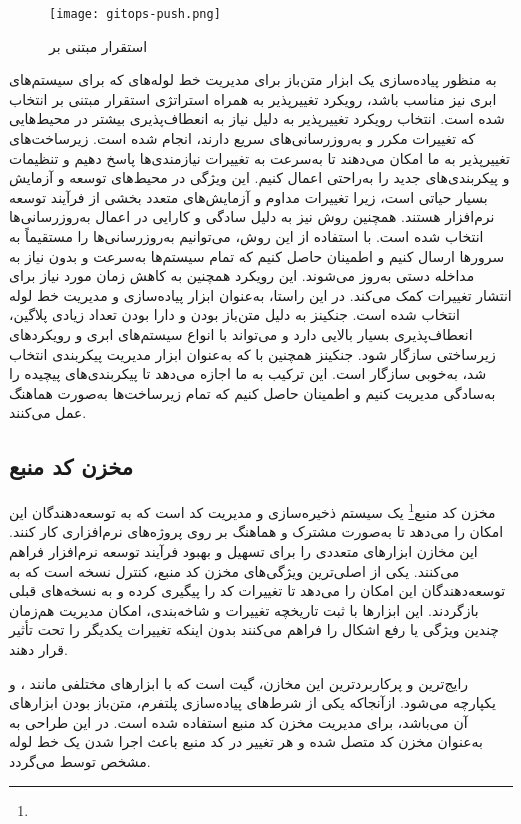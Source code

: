\begin{figure}[t]
	\centering
	\texttt{[image: gitops-push.png]}
	\caption{استقرار مبتنی بر }
	\label{fig: gitops push}
\end{figure}

به منظور پیاده‌سازی یک ابزار متن‌باز برای مدیریت خط لوله‌های  که برای سیستم‌های ابری نیز مناسب باشد، رویکرد تغییرپذیر به همراه استراتژی استقرار مبتنی بر  انتخاب شده است. انتخاب رویکرد تغییرپذیر به دلیل نیاز به انعطاف‌پذیری بیشتر در محیط‌هایی که تغییرات مکرر و به‌روزرسانی‌های سریع دارند، انجام شده است. زیرساخت‌های تغییرپذیر به ما امکان می‌دهند تا به‌سرعت به تغییرات نیازمندی‌ها پاسخ دهیم و تنظیمات و پیکربندی‌های جدید را به‌راحتی اعمال کنیم. این ویژگی در محیط‌های توسعه و آزمایش بسیار حیاتی است، زیرا تغییرات مداوم و آزمایش‌های متعدد بخشی از فرآیند توسعه نرم‌افزار هستند. همچنین روش  نیز به دلیل سادگی و کارایی در اعمال به‌روزرسانی‌ها انتخاب شده است. با استفاده از این روش، می‌توانیم به‌روزرسانی‌ها را مستقیماً به سرورها ارسال کنیم و اطمینان حاصل کنیم که تمام سیستم‌ها به‌سرعت و بدون نیاز به مداخله دستی به‌روز می‌شوند. این رویکرد همچنین به کاهش زمان مورد نیاز برای انتشار تغییرات کمک می‌کند. در این راستا،  به‌عنوان ابزار پیاده‌سازی و مدیریت خط لوله  انتخاب شده است. جنکینز به دلیل متن‌باز بودن و دارا بودن تعداد زیادی پلاگین، انعطاف‌پذیری بسیار بالایی دارد و می‌تواند با انواع سیستم‌های ابری و رویکردهای زیرساختی سازگار شود. جنکینز همچنین با  که به‌عنوان ابزار مدیریت پیکربندی انتخاب شد، به‌خوبی سازگار است. این ترکیب به ما اجازه می‌دهد تا پیکربندی‌های پیچیده را به‌سادگی مدیریت کنیم و اطمینان حاصل کنیم که تمام زیرساخت‌ها به‌صورت هماهنگ عمل می‌کنند.

\subsection{مخزن کد منبع}

مخزن کد منبع\footnote{} یک سیستم ذخیره‌سازی و مدیریت کد است که به توسعه‌دهندگان این امکان را می‌دهد تا به‌صورت مشترک و هماهنگ بر روی پروژه‌های نرم‌افزاری کار کنند. این مخازن ابزارهای متعددی را برای تسهیل و بهبود فرآیند توسعه نرم‌افزار فراهم می‌کنند. یکی از اصلی‌ترین ویژگی‌های مخزن کد منبع، کنترل نسخه است که به توسعه‌دهندگان این امکان را می‌دهد تا تغییرات کد را پیگیری کرده و به نسخه‌های قبلی بازگردند. این ابزارها با ثبت تاریخچه تغییرات و شاخه‌بندی، امکان مدیریت هم‌زمان چندین ویژگی یا رفع اشکال را فراهم می‌کنند بدون اینکه تغییرات یکدیگر را تحت تأثیر قرار دهند.

رایج‌ترین و پرکاربردترین این مخازن، گیت است که با ابزارهای مختلفی مانند ،  و  یکپارچه می‌شود. ازآنجاکه یکی از شرط‌های پیاده‌سازی پلتفرم، متن‌باز بودن ابزارهای آن می‌باشد،  برای مدیریت مخزن کد منبع استفاده شده است. در این طراحی  به  به‌عنوان مخزن کد متصل شده و هر تغییر در کد منبع باعث اجرا شدن یک خط لوله  مشخص توسط  می‌گردد.


